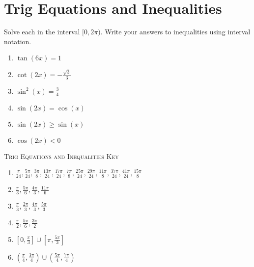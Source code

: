\chapter{Trig Equations and Inequalities}

Solve each in the interval $[0,2\pi)$. Write your answers to inequalities using interval notation.

\begin{enumerate}
	\item $\tan(6x) = 1$
    \item $\cot(2x) = -\frac{\sqrt{3}}{3}$
    \item $\sin^2 (x) = \frac{3}{4}$
    \item $\sin(2x) = \cos(x)$
    \item $\sin(2x) \geq \sin(x)$
    \item $\cos(2x) < 0$
\end{enumerate}

\newpage

\textsc{Trig Equations and Inequalities Key}

\begin{enumerate}
	\item $\frac{\pi}{24}, \frac{5\pi}{24}, \frac{3\pi}{8}, \frac{13\pi}{24}, \frac{17\pi}{24}, \frac{7\pi}{8}, \frac{25\pi}{24}, \frac{29\pi}{24}, \frac{11\pi}{8}, \frac{37\pi}{24}, \frac{41\pi}{24}, \frac{15\pi}{8}$
    
	\item $\frac{\pi}{3}, \frac{5\pi}{6}, \frac{4\pi}{3}, \frac{11\pi}{6}$
    
	\item $\frac{\pi}{3}, \frac{2\pi}{3}, \frac{4\pi}{3}, \frac{5\pi}{3}$
    
	\item $\frac{\pi}{2}, \frac{5\pi}{6}, \frac{3\pi}{2}$
    
	\item $\left[0, \frac{\pi}{3}\right] \cup \left[\pi, \frac{5\pi}{3}\right]$
    
	\item $\left(\frac{\pi}{4}, \frac{3\pi}{4}\right) \cup \left(\frac{5\pi}{4}, \frac{7\pi}{4}\right)$
\end{enumerate}
